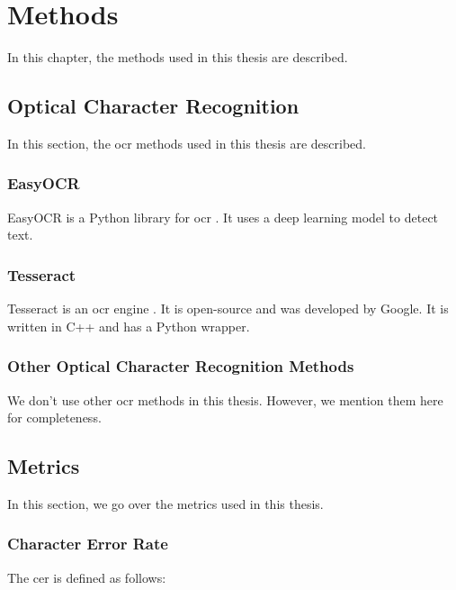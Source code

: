 \chapter{Methods}
\label{chap:methods}

In this chapter, the methods used in this thesis are described.

\section{Optical Character Recognition}
\label{sec:ocr}

In this section, the \gls{ocr} methods used in this thesis are described.

\subsection{EasyOCR}
\label{subsec:easyocr}

EasyOCR is a Python library for \gls{ocr} \cite{easyocr_2020}. It uses a deep learning model to detect text.

\subsection{Tesseract}
\label{subsec:tesseract}

Tesseract is an \gls{ocr} engine \cite{tesseract_2007}. It is open-source and was developed by Google. It is written in C++ and has a Python wrapper.

\subsection{Other Optical Character Recognition Methods}
\label{subsec:other_ocr_methods}

We don't use other \gls{ocr} methods in this thesis.
However, we mention them here for completeness.


\section{Metrics}
\label{sec:metrics}

In this section, we go over the metrics used in this thesis.

\subsection{Character Error Rate}
\label{subsec:cer}

The \gls{cer} is defined as follows:

